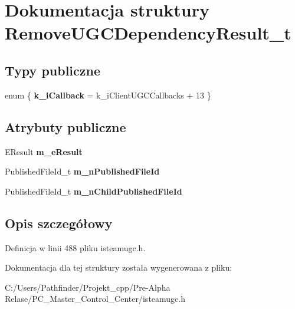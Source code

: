 \hypertarget{struct_remove_u_g_c_dependency_result__t}{}\section{Dokumentacja struktury Remove\+U\+G\+C\+Dependency\+Result\+\_\+t}
\label{struct_remove_u_g_c_dependency_result__t}
\subsection*{Typy publiczne}
\begin{DoxyCompactItemize}
\item 
\mbox{\label{struct_remove_u_g_c_dependency_result__t_aa9cddc7f71208b279f32bc5e9cd01dba}} 
enum \{ {\bfseries k\+\_\+i\+Callback} = k\+\_\+i\+Client\+U\+G\+C\+Callbacks + 13
 \}
\end{DoxyCompactItemize}
\subsection*{Atrybuty publiczne}
\begin{DoxyCompactItemize}
\item 
\mbox{\label{struct_remove_u_g_c_dependency_result__t_a1d4d26e2d69b6e989af93a124ca917e9}} 
E\+Result {\bfseries m\+\_\+e\+Result}
\item 
\mbox{\label{struct_remove_u_g_c_dependency_result__t_a2de343c805a2b490f57dcbf245a43b6b}} 
Published\+File\+Id\+\_\+t {\bfseries m\+\_\+n\+Published\+File\+Id}
\item 
\mbox{\label{struct_remove_u_g_c_dependency_result__t_aa059ca6cf32a98f5ebdef3d0c2901f88}} 
Published\+File\+Id\+\_\+t {\bfseries m\+\_\+n\+Child\+Published\+File\+Id}
\end{DoxyCompactItemize}


\subsection{Opis szczegółowy}


Definicja w linii 488 pliku isteamugc.\+h.



Dokumentacja dla tej struktury została wygenerowana z pliku\+:\begin{DoxyCompactItemize}
\item 
C\+:/\+Users/\+Pathfinder/\+Projekt\+\_\+cpp/\+Pre-\/\+Alpha Relase/\+P\+C\+\_\+\+Master\+\_\+\+Control\+\_\+\+Center/isteamugc.\+h\end{DoxyCompactItemize}
